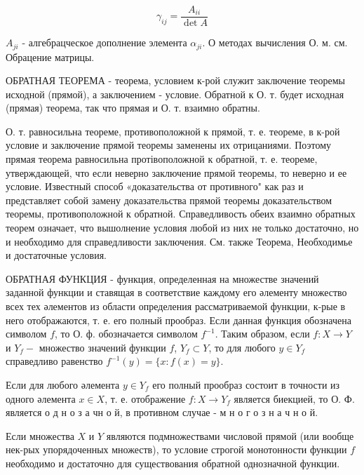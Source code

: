 \documentclass[10pt]{article}
\begin{document}
\[

\gamma_{i j}=\frac{A_{i i}}{\operatorname{det} A}

\]



$A_{j i}$ - алгебрацческое дополнение элемента $\alpha_{j i}$. О методах вычисления О. м. см. Обрацение матрицы.



ОБРАТНАЯ ТЕОРЕМА - теорема, условием к-рой служит заключение теоремы исходной (прямой), а заключением - условие. Обратной к О. т. будет исходная (прямая) теорема, так что прямая и О. т. взаимно обратны.



О. т. равносильна теореме, противоположной к прямой, т. е. теореме, в к-рой условие и заключение прямой теоремы заменены их отрицаниями. Поэтому прямая теорема равносильна протівоположной к обратной, т. е. теореме, утверждающей, что если неверно заключение прямой теоремы, то неверно и ее условие. Известный способ «доказательства от противного" как раз и представляет собой замену доказательства прямой теоремы доказательством теоремы, противоположной к обратной. Справедливость обеих взаимно обратных теорем означает, что вышолнение условия любой из них не только достаточно, но и необходимо для справедливости заключения. См. также Теорема, Необходимье и достаточные условия.



ОБРАТНАЯ ФУНКЦИЯ - функция, определенная на множестве значений заданной функции и ставящая в соответствие каждому его әлементу множество всех тех әлементов из области определения рассматриваемой функции, к-рые в него отображаются, т. е. его полный прообраз. Если данная функция обозначена символом $f$, то О. ф. обозначается символом $f^{-1}$. Таким образом, если $f: X \rightarrow Y$ и $Y_{f}-$ множество значений функции $f$, $Y_{f} \subset Y$, то для любого $y \in Y_{f}$ справедливо равенство $f^{-1}(y)=\{x: f(x)=y\}$.



Если для любого әлемента $y \in Y_{f}$ его полный прообраз состоит в точности из одного әлемента $x \in X$, т. е. отображение $f: X \rightarrow Y_{f}$ является биекцией, то О. Ф. является о д н о з а чн о й, в противном случае - м н о г о з н а ч н о й.



Если множества $X$ и $Y$ являются подмножествами числовой прямой (или вообще нек-рых упорядоченных множеств), то условие строгой монотонности функции $f$ необходимо и достаточно для существования обратной однозначной функции.
\end{document}
